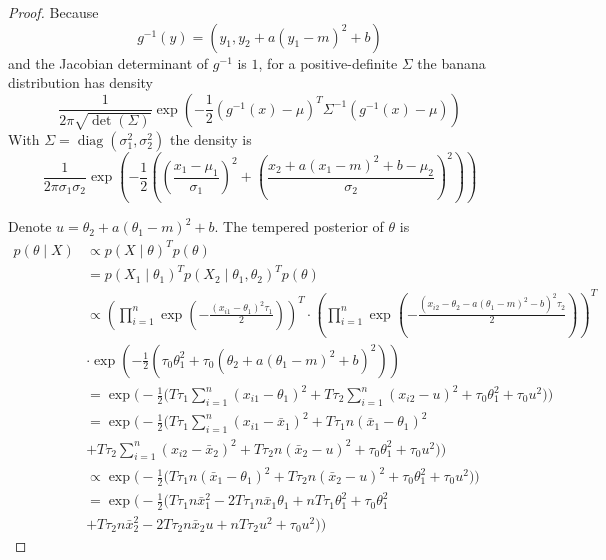 \documentclass[english,twoside,openright]{HYgraduMLDS}
\DeclareMathOperator{\diag}{diag}
\begin{document}
\begin{proof}
    Because
    \[
    g^{-1}(y) = (y_1, y_2 + a(y_1 - m)^2 + b)
    \]
    and the Jacobian determinant of \(g^{-1}\) is \(1\),
    for a positive-definite \(\Sigma\) the banana distribution has
    density
    \[
    \frac{1}{2\pi\sqrt{\det(\Sigma)}}\exp
    \left(-\frac{1}{2}(g^{-1}(x) - \mu)^T\Sigma^{-1}(g^{-1}(x) - \mu)\right)
    \]
    With \(\Sigma = \diag(\sigma_1^2, \sigma_2^2)\) the density is
    \[
    \frac{1}{2\pi\sigma_1\sigma_2}\exp
    \left(-\frac{1}{2}\left(\left(\frac{x_1 - \mu_1}{\sigma_1}\right)^2
    + \left(\frac{x_2 + a(x_1 - m)^2 + b - \mu_2}{\sigma_2}\right)^2\right)\right)
    \]

    Denote \(u = \theta_2 + a(\theta_1 - m)^2 + b\).
    The tempered posterior of \(\theta\) is
    \begin{align*}
        p(\theta\mid X) &\propto p(X\mid \theta)^Tp(\theta)
        \\&= p(X_1\mid \theta_1)^Tp(X_2\mid \theta_1, \theta_2)^Tp(\theta)
        \\&\propto \left(\prod_{i=1}^n \exp
        \left(-\frac{(x_{i1} - \theta_1)^2\tau_1}{2}\right)\right)^T
        \cdot\left(\prod_{i=1}^n \exp\left(-\frac{(x_{i2} - \theta_2
        - a(\theta_1 - m)^2 - b)^2\tau_2}{2}\right)\right)^T
        \\&\cdot \exp\left(-\frac{1}{2}\left(\tau_0\theta_1^2
        + \tau_0(\theta_2 + a(\theta_1 - m)^2 + b)^2\right)\right)
        \\&=\exp\Bigg(-\frac{1}{2}\Big(T\tau_1\sum_{i=1}^n
        (x_{i1} - \theta_1)^2
        + T\tau_2\sum_{i=1}^n(x_{i2} - u)^2
        + \tau_0\theta_1^2 + \tau_0 u^2\Big)\Bigg)
        \\&=\exp\Bigg(-\frac{1}{2}\Big(T\tau_1\sum_{i=1}^n
        (x_{i1} - \bar{x}_1)^2 + T\tau_1n(\bar{x}_1 - \theta_1)^2
        \\&+ T\tau_2\sum_{i=1}^n (x_{i2}  - \bar{x}_2)^2 + T\tau_2n(\bar{x}_2 - u)^2
        + \tau_0\theta_1^2 + \tau_0 u^2\Big)\Bigg)
        \\&\propto\exp\Bigg(-\frac{1}{2}\Big(T\tau_1n(\bar{x}_1 - \theta_1)^2
        + T\tau_2n(\bar{x}_2 - u)^2
        + \tau_0\theta_1^2 + \tau_0 u^2\Big)\Bigg)
        \\&=\exp\Bigg(-\frac{1}{2}\Big(T\tau_1n\bar{x}_1^2
        - 2T\tau_1n\bar{x}_1\theta_1 + nT\tau_1\theta_1^2 + \tau_0\theta_1^2
        \\&+ T\tau_2n\bar{x}_2^2 - 2T\tau_2n\bar{x}_2u + nT\tau_2u^2
        + \tau_0 u^2\Big)\Bigg)

\end{align*}
\end{proof}
\end{document}
